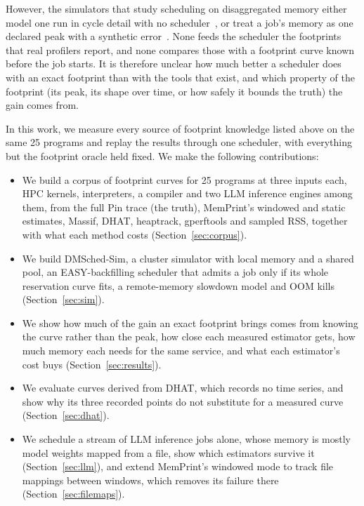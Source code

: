 \documentclass[11pt]{article}
\newcommand{\memprint}{MemPrint}
\newcommand{\secref}[1]{Section~\ref{#1}}
\begin{document}
However, the simulators that study scheduling on disaggregated memory either model one run in cycle
detail with no scheduler~\cite{Puri2024DRackSim,CXLClusterSim,CXLDMSim,Yang2023CXLMemSim}, or treat a job's
memory as one declared peak with a synthetic error~\cite{Zacarias2021Accurate,Zacarias2021Throughput}. None
feeds the scheduler the footprints that real profilers report, and none compares those with a footprint
curve known before the job starts. It is therefore unclear how much better a scheduler does with an exact
footprint than with the tools that exist, and which property of the footprint (its peak, its shape over
time, or how safely it bounds the truth) the gain comes from.

In this work, we measure every source of footprint knowledge listed above on the same 25 programs and
replay the results through one scheduler, with everything but the footprint oracle held fixed. We make the
following contributions:
\begin{itemize}
  \item We build a corpus of footprint curves for 25 programs at three inputs each, HPC kernels, interpreters, a
    compiler and two LLM inference engines among them, from the full Pin trace
    (the truth), \memprint{}'s windowed and static estimates, Massif, DHAT, heaptrack, gperftools and sampled
    RSS, together with what each method costs (\secref{sec:corpus}).
  \item We build DMSched-Sim, a cluster simulator with local memory and a shared pool, an EASY-backfilling
    scheduler that admits a job only if its whole reservation curve fits, a remote-memory slowdown model and
    OOM kills (\secref{sec:sim}).
  \item We show how much of the gain an exact footprint brings comes from knowing the curve rather than the
    peak, how close each measured estimator gets, how much memory each needs for the same service, and what
    each estimator's cost buys (\secref{sec:results}).
  \item We evaluate curves derived from DHAT, which records no time series, and show why its three recorded
    points do not substitute for a measured curve (\secref{sec:dhat}).
  \item We schedule a stream of LLM inference jobs alone, whose memory is mostly model weights mapped from a file,
    show which estimators survive it (\secref{sec:llm}), and extend \memprint{}'s windowed mode to track file
    mappings between windows, which removes its failure there (\secref{sec:filemaps}).
\end{itemize}
\end{document}
